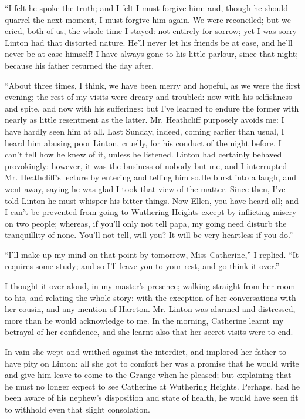 \par “I felt he spoke the truth; and I felt I must forgive him: and, though he should quarrel the next moment, I must forgive him again. We were reconciled; but we cried, both of us, the whole time I stayed: not entirely for sorrow; yet I was sorry Linton had that distorted nature. He'll never let his friends be at ease, and he'll never be at ease himself! I have always gone to his little parlour, since that night; because his father returned the day after.
\par “About three times, I think, we have been merry and hopeful, as we were the first evening; the rest of my visits were dreary and troubled: now with his selfishness and spite, and now with his sufferings: but I've learned to endure the former with nearly as little resentment as the latter. Mr. Heathcliff purposely avoids me: I have hardly seen him at all. Last Sunday, indeed, coming earlier than usual, I heard him abusing poor Linton, cruelly, for his conduct of the night before. I can't tell how he knew of it, unless he listened. Linton had certainly behaved provokingly: however, it was the business of nobody but me, and I interrupted Mr. Heathcliff's lecture by entering and telling him so.He burst into a laugh, and went away, saying he was glad I took that view of the matter. Since then, I've told Linton he must whisper his bitter things. Now Ellen, you have heard all; and I can't be prevented from going to Wuthering Heights except by inflicting misery on two people; whereas, if you'll only not tell papa, my going need disturb the tranquillity of none. You'll not tell, will you? It will be very heartless if you do.”
\par “I'll make up my mind on that point by tomorrow, Miss Catherine,” I replied. “It requires some study; and so I'll leave you to your rest, and go think it over.”
\par I thought it over aloud, in my master's presence; walking straight from her room to his, and relating the whole story: with the exception of her conversations with her cousin, and any mention of Hareton. Mr. Linton was alarmed and distressed, more than he would acknowledge to me. In the morning, Catherine learnt my betrayal of her confidence, and she learnt also that her secret visits were to end.
\par In vain she wept and writhed against the interdict, and implored her father to have pity on Linton: all she got to comfort her was a promise that he would write and give him leave to come to the Grange when he pleased; but explaining that he must no longer expect to see Catherine at Wuthering Heights. Perhaps, had he been aware of his nephew's disposition and state of health, he would have seen fit to withhold even that slight consolation.



